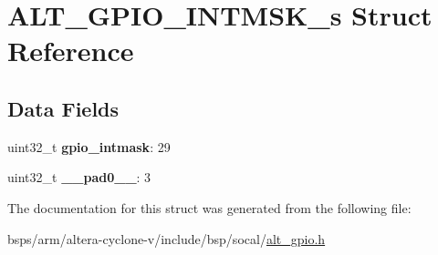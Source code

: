 \hypertarget{structALT__GPIO__INTMSK__s}{}\section{A\+L\+T\+\_\+\+G\+P\+I\+O\+\_\+\+I\+N\+T\+M\+S\+K\+\_\+s Struct Reference}
\label{structALT__GPIO__INTMSK__s}
\subsection*{Data Fields}
\begin{DoxyCompactItemize}
\item 
\mbox{\label{structALT__GPIO__INTMSK__s_aa8b6ac5d89a3e81c733a1ef49bf8ce2a}} 
uint32\+\_\+t {\bfseries gpio\+\_\+intmask}\+: 29
\item 
\mbox{\label{structALT__GPIO__INTMSK__s_a444b792a8c91fe2f8e1a9417ab36b9c6}} 
uint32\+\_\+t {\bfseries \+\_\+\+\_\+pad0\+\_\+\+\_\+}\+: 3
\end{DoxyCompactItemize}


The documentation for this struct was generated from the following file\+:\begin{DoxyCompactItemize}
\item 
bsps/arm/altera-\/cyclone-\/v/include/bsp/socal/\mbox{\hyperlink{alt__gpio_8h}{alt\+\_\+gpio.\+h}}\end{DoxyCompactItemize}
